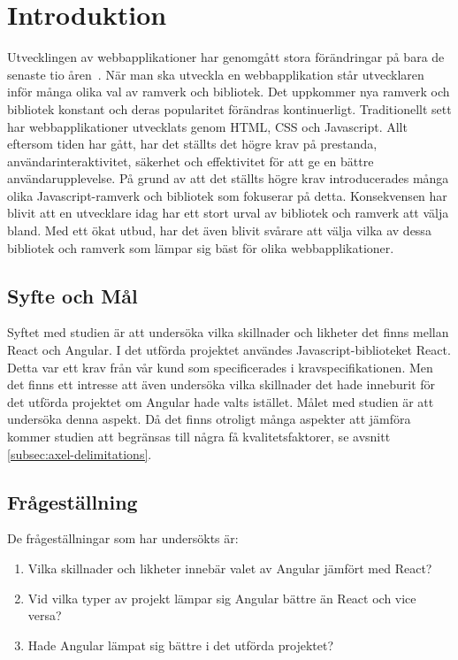 \section{Introduktion}
\label{sec:axel-introduction}
Utvecklingen av webbapplikationer har genomgått stora förändringar på bara de senaste tio åren~\cite{changing}. När man ska utveckla en webbapplikation står utvecklaren inför många olika val av ramverk och bibliotek. Det uppkommer nya ramverk och bibliotek konstant och deras popularitet förändras kontinuerligt. Traditionellt sett har webbapplikationer utvecklats genom HTML, CSS och Javascript. Allt eftersom tiden har gått, har det ställts det högre krav på prestanda, användarinteraktivitet, säkerhet och effektivitet för att ge en bättre användarupplevelse. På grund av att det ställts högre krav introducerades många olika Javascript-ramverk och bibliotek som fokuserar på detta. Konsekvensen har blivit att en utvecklare idag har ett stort urval av bibliotek och ramverk att välja bland. Med ett ökat utbud, har det även blivit svårare att välja vilka av dessa bibliotek och ramverk som lämpar sig bäst för olika webbapplikationer.

\subsection{Syfte och Mål}
\label{subsec:axel-motivation}

Syftet med studien är att undersöka vilka skillnader och likheter det finns mellan React och Angular. I det utförda projektet användes Javascript-biblioteket React. Detta var ett krav från vår kund som specificerades i kravspecifikationen. Men det finns ett intresse att även undersöka vilka skillnader det hade inneburit för det utförda projektet om Angular hade valts istället. Målet med studien är att undersöka denna aspekt. Då det finns otroligt många aspekter att jämföra kommer studien att begränsas till några få kvalitetsfaktorer, se avsnitt \ref{subsec:axel-delimitations}.

\subsection{Frågeställning}
\label{subsec:axel-research-questions}

De frågeställningar som har undersökts är:

\begin{enumerate}
\item\label{axel-fs:1} Vilka skillnader och likheter innebär valet av Angular jämfört med React?

\item\label{axel-fs:2} Vid vilka typer av projekt lämpar sig Angular bättre än React och vice versa?

\item\label{axel-fs:3} Hade Angular lämpat sig bättre i det utförda projektet?


\end{enumerate}


